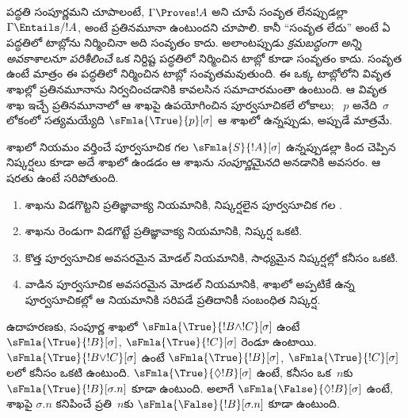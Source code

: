 \documentclass[../../../include/open-logic-section]{subfiles}
\begin{document}


\begin{explain}
   పద్ధతి సంపూర్ణమని చూపాలంటే,
  $\Gamma \Proves !A$ అని చూపే సంవృత 
లేనప్పుడల్లా $\Gamma \Entails/ !A$, అంటే ప్రతినమూనా
ఉంటుందని చూపాలి. కానీ ``సంవృత 
లేదు'' అంటే ఏ పద్ధతిలో టాబ్లోను నిర్మించినా అది సంవృతం
కాదు. అలాంటప్పుడు \emph{క్రమబద్ధంగా అన్ని అవకాశాలనూ పరిశీలించే}
ఒక నిర్దిష్ట పద్ధతిలో నిర్మించిన టాబ్లో కూడా సంవృతం కాదు.
సంవృత  ఉంటే మాత్రం ఈ పద్ధతిలో
నిర్మించిన టాబ్లో సంవృతమవుతుంది. ఈ ఒక్క టాబ్లోలోని వివృత
శాఖల్లో ప్రతినమూనాను నిర్వచించడానికి కావలసిన సమాచారమంతా ఉంటుంది. ఆ వివృత శాఖ ఇచ్చే
ప్రతినమూనాలో ఆ శాఖపై ఉపయోగించిన పూర్వసూచికలే లోకాలు;
~$p$ అనేది~$\sigma$ లోకంలో సత్యమయ్యేది
$\sFmla{\True}{p}[\sigma]$ ఆ శాఖలో ఉన్నప్పుడు, అప్పుడే మాత్రమే.
\end{explain}

\begin{defn}
   శాఖలో నియమం వర్తించే
  పూర్వసూచిక గల  $\sFmla{S}{!A}[\sigma]$
  ఉన్నప్పుడల్లా కింద చెప్పిన నిష్కర్షలు కూడా అదే శాఖలో ఉండడం
ఆ శాఖను \emph{సంపూర్ణమైనది} అనడానికి అవసరం. ఆ షరతు ఉంటే సరిపోతుంది.
  \begin{enumerate}
    \item శాఖను విడగొట్టని ప్రతిజ్ఞావాక్య నియమానికి,
      నిష్కర్షలైన పూర్వసూచిక గల .
    \item శాఖను రెండుగా విడగొట్టే ప్రతిజ్ఞావాక్య నియమానికి,
      నిష్కర్ష  ఒకటి.
    \item కొత్త పూర్వసూచిక అవసరమైన మోడల్ నియమానికి,
      సాధ్యమైన నిష్కర్షల్లో కనీసం ఒకటి.
    \item వాడిన పూర్వసూచిక అవసరమైన మోడల్ నియమానికి,
      శాఖలో అప్పటికే ఉన్న పూర్వసూచికల్లో ఆ నియమానికి
      సరిపడే ప్రతిదానికీ సంబంధిత నిష్కర్ష.
  \end{enumerate}
\end{defn}

\begin{explain}
ఉదాహరణకు, సంపూర్ణ శాఖలో $\sFmla{\True}{!B \land !C}[\sigma]$
ఉంటే $\sFmla{\True}{!B}[\sigma]$,
$\sFmla{\True}{!C}[\sigma]$ రెండూ ఉంటాయి.
$\sFmla{\True}{!B \lor !C}[\sigma]$ ఉంటే
$\sFmla{\True}{!B}[\sigma]$, $\sFmla{\True}{!C}[\sigma]$
లలో కనీసం ఒకటి ఉంటుంది.
{$\sFmla{\True}{\Diamond !B}[\sigma]$} ఉంటే, కనీసం ఒక~$n$కు
{$\sFmla{\True}{!B}[\sigma.n]$} కూడా ఉంటుంది.
అలాగే 
{$\sFmla{\False}{\Diamond !B}[\sigma]$} ఉంటే,
శాఖపై $\sigma.n$ కనిపించే ప్రతి~$n$కు
{$\sFmla{\False}{!B}[\sigma.n]$} కూడా ఉంటుంది.
\end{explain}
\end{document}
